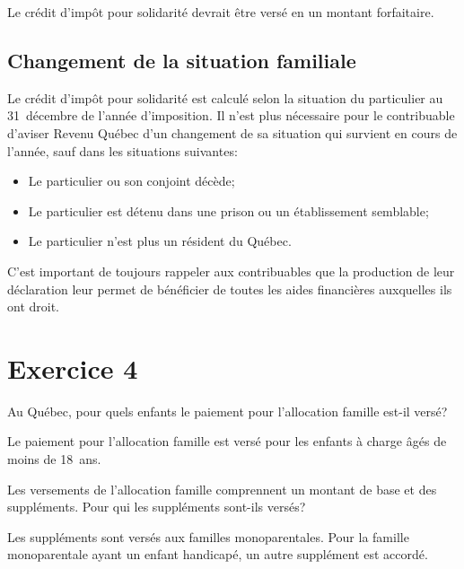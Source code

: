 Le crédit d'impôt pour solidarité devrait être versé en un montant forfaitaire.


\subsection{Changement de la situation familiale}
Le crédit d'impôt pour solidarité est calculé selon la situation du particulier au 31~décembre de l'année d'imposition. Il n'est plus nécessaire pour le contribuable d'aviser Revenu Québec d'un changement de sa situation qui survient en cours de l'année, sauf dans les situations suivantes:
\begin{itemize}
	\item Le particulier ou son conjoint décède;
	\item Le particulier est détenu dans une prison ou un établissement semblable;
	\item Le particulier n'est plus un résident du Québec.
\end{itemize}

\begin{note}
	C'est important de toujours rappeler aux contribuables que la production de leur déclaration leur permet de bénéficier de toutes les aides financières auxquelles ils ont droit.
\end{note}



\section{Exercice 4}
\setcounter{question}{0}
\begin{question}
	Au Québec, pour quels enfants le paiement pour l'allocation famille est-il versé?
\end{question}
Le paiement pour l'allocation famille est versé pour les enfants à charge âgés de moins de 18~ans.

\begin{question}
	Les versements de l'allocation famille comprennent un montant de base et des suppléments. Pour qui les suppléments sont-ils versés?
\end{question}
Les suppléments sont versés aux familles monoparentales.
Pour la famille monoparentale ayant un enfant handicapé, un autre supplément est accordé.

